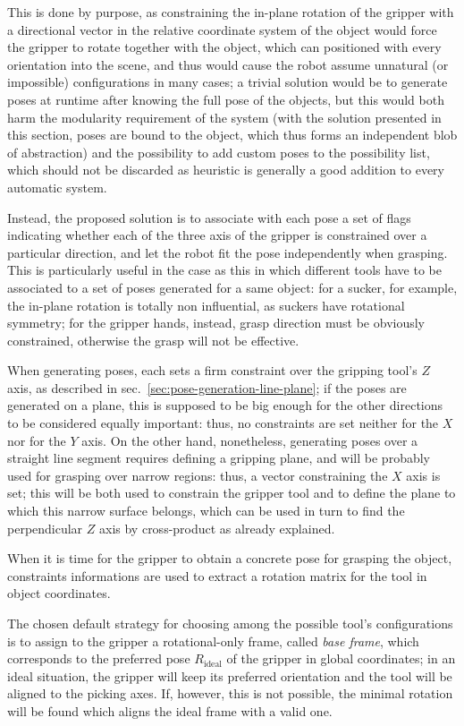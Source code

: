 This is done by purpose, as constraining the in-plane rotation of the
gripper with a directional vector in the relative coordinate system of
the object would force the gripper to rotate together with the object,
which can positioned with every orientation into the scene, and thus
would cause the robot assume unnatural (or impossible) configurations
in many cases; a trivial solution would be to generate poses at
runtime after knowing the full pose of the objects, but this would
both harm the modularity requirement of the system (with the solution
presented in this section, poses are bound to the object, which thus
forms an independent blob of abstraction) and the possibility to add
custom poses to the possibility list, which should not be discarded as
heuristic is generally a good addition to every automatic system.

Instead, the proposed solution is to associate with each pose a set of
flags indicating whether each of the three axis of the gripper is
constrained over a particular direction, and let the robot fit the
pose independently when grasping. This is particularly useful in the
case as this in which different tools have to be associated to a set
of poses generated for a same object: for a sucker, for example, the
in-plane rotation is totally non influential, as suckers have
rotational symmetry; for the gripper hands, instead, grasp direction
must be obviously constrained, otherwise the grasp will not be effective.

When generating poses, each sets a firm constraint over the gripping
tool's $Z$ axis, as described in
sec.~\ref{sec:pose-generation-line-plane}; if the poses are generated
on a plane, this is supposed to be big enough for the other directions
to be considered equally important: thus, no constraints are set
neither for the $X$ nor for the $Y$ axis. On the other hand,
nonetheless, generating poses over a straight line segment requires
defining a gripping plane, and will be probably used for grasping
over narrow regions: thus, a vector constraining the $X$ axis is set;
this will be both used to constrain the gripper tool and to define the
plane to which this narrow surface belongs, which can be used in turn
to find the perpendicular $Z$ axis by cross-product as already explained.

When it is time for the gripper to obtain a concrete pose for grasping
the object, constraints informations are used to extract a rotation
matrix for the tool in object coordinates.

The chosen default strategy for choosing among the possible tool's
configurations is to assign to the gripper a rotational-only frame, called \emph{base
  frame}, which corresponds to the preferred pose $R_{\text{ideal}}$ of the gripper in
global coordinates; in an ideal situation, the gripper will keep its
preferred orientation and the tool will be aligned to the picking
axes. If, however, this is not possible, the minimal rotation will be
found which aligns the ideal frame with a valid one.

